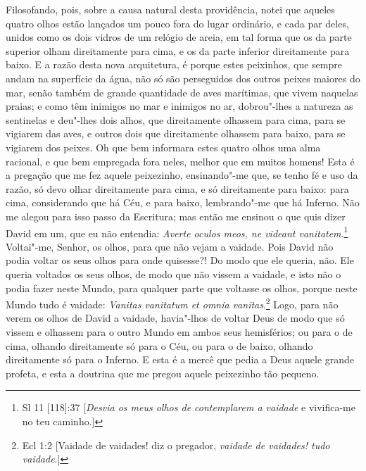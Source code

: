 Filosofando, pois, sobre a causa natural desta providência, notei que
aqueles quatro olhos estão lançados um pouco fora do lugar ordinário, e
cada par deles, unidos como os dois vidros de um relógio de areia, em
tal forma que os da parte superior olham direitamente para cima, e os da
parte inferior direitamente para baixo. E a razão desta nova
arquitetura, é porque estes peixinhos, que sempre andam na superfície da
água, não só são perseguidos dos outros peixes maiores do mar, senão
também de grande quantidade de aves marítimas, que vivem naquelas
praias; e como têm inimigos no mar e inimigos no ar, dobrou"-lhes a
natureza as sentinelas e deu"-lhes dois alhos, que direitamente olhassem
para cima, para se vigiarem das aves, e outros dois que direitamente
olhassem para baixo, para se vigiarem dos peixes.
Oh que bem informara estes quatro olhos uma alma racional, e que bem
empregada fora neles, melhor que em muitos homens! Esta é a pregação que
me fez aquele peixezinho, ensinando"-me que, se tenho fé e uso da razão,
só devo olhar direitamente para cima, e só direitamente para baixo: para
cima, considerando que há Céu, e para baixo, lembrando"-me que há
Inferno. Não me alegou para isso passo da Escritura; mas então me
ensinou o que quis dizer David em um, que eu não entendia: \emph{Averte
oculos meos, ne videant vanitatem}.\footnote{Sl 11 [118]:37 [\emph{Desvia os meus olhos de contemplarem a vaidade} e vivifica-me no teu caminho.]} Voltai"-me, Senhor, os olhos, para
que não vejam a vaidade.
Pois David não podia voltar os seus olhos para onde quisesse?! Do modo
que ele queria, não. Ele queria voltados os seus olhos, de modo que não
vissem a vaidade, e isto não o podia fazer neste Mundo, para qualquer
parte que voltasse os olhos, porque neste Mundo tudo é vaidade:
\emph{Vanitas vanitatum et omnia vanitas}.\footnote{Ecl 1:2 [Vaidade de vaidades! diz o pregador, \emph{vaidade de vaidades! tudo vaidade}.]} Logo, para não verem os olhos
de David a vaidade, havia"-lhos de voltar Deus de modo que só vissem e
olhassem para o outro Mundo em ambos seus hemisférios; ou para o de
cima, olhando direitamente só para o Céu, ou para o de baixo, olhando
direitamente só para o Inferno. E esta é a mercê que pedia a Deus aquele
grande profeta, e esta a doutrina que me pregou aquele peixezinho tão
pequeno.

